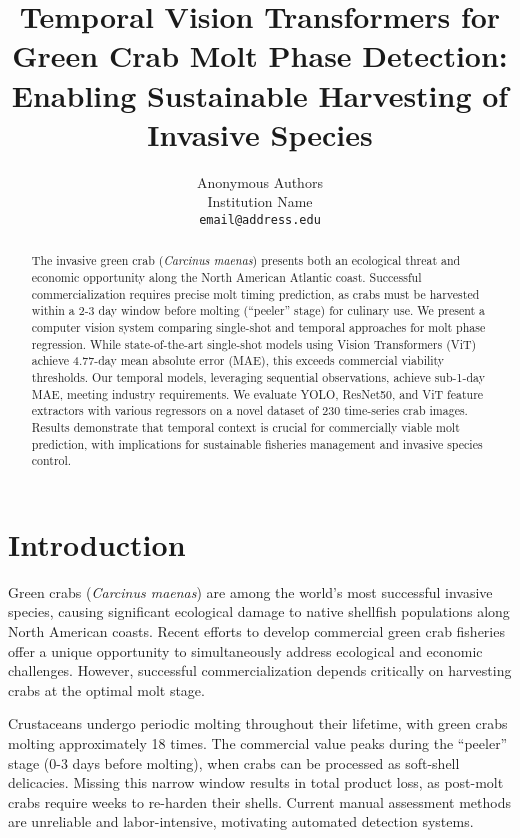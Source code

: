 \documentclass[10pt,twocolumn,letterpaper]{article}
\begin{document}
\title{Temporal Vision Transformers for Green Crab Molt Phase Detection:\\
Enabling Sustainable Harvesting of Invasive Species}

\author{Anonymous Authors\\
Institution Name\\
{\tt\small email@address.edu}
}

\maketitle

\begin{abstract}
The invasive green crab (\textit{Carcinus maenas}) presents both an ecological threat and economic opportunity along the North American Atlantic coast. Successful commercialization requires precise molt timing prediction, as crabs must be harvested within a 2-3 day window before molting (``peeler'' stage) for culinary use. We present a computer vision system comparing single-shot and temporal approaches for molt phase regression. While state-of-the-art single-shot models using Vision Transformers (ViT) achieve 4.77-day mean absolute error (MAE), this exceeds commercial viability thresholds. Our temporal models, leveraging sequential observations, achieve sub-1-day MAE, meeting industry requirements. We evaluate YOLO, ResNet50, and ViT feature extractors with various regressors on a novel dataset of 230 time-series crab images. Results demonstrate that temporal context is crucial for commercially viable molt prediction, with implications for sustainable fisheries management and invasive species control.
\end{abstract}

\section{Introduction}

Green crabs (\textit{Carcinus maenas}) are among the world's most successful invasive species, causing significant ecological damage to native shellfish populations along North American coasts. Recent efforts to develop commercial green crab fisheries offer a unique opportunity to simultaneously address ecological and economic challenges. However, successful commercialization depends critically on harvesting crabs at the optimal molt stage.

Crustaceans undergo periodic molting throughout their lifetime, with green crabs molting approximately 18 times. The commercial value peaks during the ``peeler'' stage (0-3 days before molting), when crabs can be processed as soft-shell delicacies. Missing this narrow window results in total product loss, as post-molt crabs require weeks to re-harden their shells. Current manual assessment methods are unreliable and labor-intensive, motivating automated detection systems.
\end{document}
